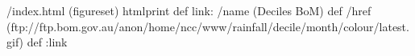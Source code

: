 /index.html {(figureset) htmlprint} def
link:
/name (Deciles BoM) def
/href (ftp://ftp.bom.gov.au/anon/home/ncc/www/rainfall/decile/month/colour/latest.gif) def
:link
\begin{ingrid}
\end{ingrid}